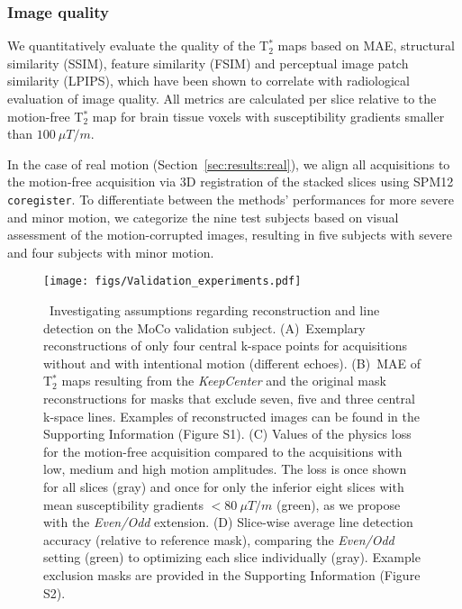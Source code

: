 \documentclass[AMA,STIX2COL]{MRM}
\newcommand{\tstar}[1]{{T$_2^*$}}
\begin{document}
\subsubsection{Image quality}  \label{sec:methods:img_qual}
We quantitatively evaluate the quality of the \tstar{} maps based on MAE, structural similarity (SSIM), feature similarity (FSIM) and perceptual image patch similarity (LPIPS), which have been shown to correlate with radiological evaluation of image quality.\cite{Marchetto_2024,Eichhorn_2025_ISMRM} All metrics are calculated per slice relative to the motion-free \tstar{} map for brain tissue voxels with susceptibility gradients smaller than $100~\mu T/m$. 

In the case of real motion (Section~\ref{sec:results:real}), we align  all acquisitions to the motion-free acquisition via 3D registration of the stacked slices using SPM12\cite{SPM12} \texttt{coregister}. To differentiate between the methods’ performances for more severe and minor motion, we categorize the nine test subjects based on visual assessment of the motion-corrupted images, resulting in five subjects with severe and four subjects with minor motion.

%
\begin{figure*}
\centerline{\texttt{[image: figs/Validation\_experiments.pdf]}}
\caption{\ Investigating assumptions regarding reconstruction and line detection on the MoCo validation subject. 
(A)~Exemplary reconstructions of only four central k-space points for acquisitions without and with intentional motion (different echoes). 
(B)~MAE of \tstar{} maps resulting from the \textit{KeepCenter} and the original mask reconstructions for masks that exclude seven, five and three central k-space lines. Examples of reconstructed images can be found in the Supporting Information (Figure S1).
(C) Values of the physics loss for the motion-free acquisition compared to the acquisitions with low, medium and high motion amplitudes. The loss is once shown for all slices (gray) and once for only the inferior eight slices with mean susceptibility gradients $<80~\mu T/m$ (green), as we propose with the \textit{Even/Odd} extension.
(D) Slice-wise average line detection accuracy (relative to reference mask), comparing the \textit{Even/Odd} setting (green) to optimizing each slice individually (gray). Example exclusion masks are provided in the Supporting Information (Figure S2).
}\label{fig:Val}
\end{figure*}
%
\end{document}
